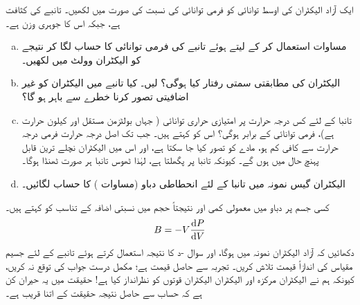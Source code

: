 ایک آزاد الیکٹران کی اوسط توانائی  کو فرمی توانائی کی نسبت کی صورت میں لکھیں۔
 
تانبے کی کثافت  ہے، جبکہ اس کا جوہری وزن  ہے۔
\begin{enumerate}[a.]
\item
 مساوات  استعمال کر کے  لیتے ہوئے تانبے کی فرمی توانائی کا حساب لگا کر نتیجے کو الیکٹران وولٹ میں لکھیں۔
\item
 الیکٹران کی مطابقتی سمتی رفتار کیا ہوگی؟  لیں۔ کیا تانبے میں الیکٹران کو غیر اضافیتی تصور کرنا خطرے سے باہر ہو گا؟
\item
 تانبا کے لئے کس درجہ حرارت پر امتیازی حراری توانائی (  جہاں  بولٹزمن مستقل اور  کیلون حرارت ہے)، فرمی توانائی کے برابر ہوگی؟ اس کو کہتے ہیں۔ جب تک اصل درجہ حرارت فرمی درجہ حرارت سے کافی کم ہو، مادے کو  تصور کیا جا سکتا ہے، اور اس میں الیکٹران نچلے ترین قابل پہنچ حال میں ہوں گے۔ کیونکہ تانبا  پر پگھلتا ہے، لہٰذا ٹھوس تانبا ہر صورت ٹھنڈا ہوگا۔
\item 
 الیکٹران گیس نمونہ میں تانبا کے لئے انحطاطی دباو (مساوات ) کا حساب لگائیں۔
 \end{enumerate}
کسی جسم پر دباو میں معمولی کمی اور نتیجتاً حجم میں نسبتی اضافہ کے تناسب کو  کہتے ہیں۔
\begin{align*}
	B = -V\frac{\dif P}{\dif V}
\end{align*}
دکھائیں کہ آزاد الیکٹران نمونہ میں ہوگا، اور سوال -د کا نتیجہ استعمال کرتے ہوئے تانبے کے لئے جسیم مقیاس کی اندازاً قیمت تلاش کریں۔  تجربہ سے حاصل قیمت  ہے؛ مکمل درست جواب کی توقع نہ کریں، کیونکہ ہم نے الیکٹران مرکزہ اور الیکٹران الیکٹران قوتوں کو نظرانداز کیا ہے! حقیقت میں یہ حیران کن ہے کہ حساب سے حاصل نتیجہ حقیقت کے اتنا قریب ہے۔ 


